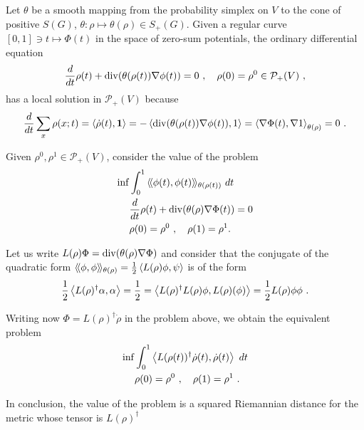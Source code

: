 \documentclass[12pt,a4paper]{amsart}
\begin{document}
Let $\theta$ be a smooth mapping from the probability simplex on $V$ to the
cone of positive $S(G)$, $\theta \colon \rho \mapsto \theta(\rho) \in
S_+(G)$. Given a regular curve $[0,1] \ni t \mapsto \Phi(t)$ in the
space of zero-sum potentials, the ordinary differential equation
\begin{equation*}
  \derivby t \rho(t) +  \Div(\theta(\rho(t))\nabla \phi(t)) = 0 \ , \quad
  \rho(0) = \rho^0 \in \mathcal P_+(V) \ ,
\end{equation*}
has a local solution in $\mathcal P_+(V)$ because
\begin{equation*}
  \derivby t \sum_x \rho(x;t) = \scalarof {\dot \rho(t)}{\one} = 
 - \scalarof {\Div(\theta(\rho(t))\nabla \phi(t))}{1} = \scalarat
 {\theta(\rho)} {\nabla \Phi(t)}{\nabla 1}
 = 0 \ .
\end{equation*}

Given $\rho^0, \rho^1 \in \mathcal P_+(V)$, consider the value of the problem
\begin{align*}
 \inf &\int_0^1 \Scalarat {\theta(\rho(t))} {\phi(t)}{\phi(t)} \ dt
 \\
 &\derivby t \rho(t) +  \Div(\theta(\rho)\nabla \Phi(t)) = 0 \\
 &\rho(0) = \rho^0 \ , \quad \rho(1) = \rho^1.
\end{align*}

Let us write $L(\rho)\Phi = \Div(\theta(\rho)\nabla \Phi)$ and
consider that the conjugate of the quadratic form
$\Scalarat {\theta(\rho)} \phi \phi = \frac 12 \scalarof {L(\rho)\phi}
\psi$ is of the form
\begin{equation*}
  \frac 12 \scalarof {L(\rho)^\dagger \alpha} {\alpha} = \frac12 =
  \scalarof {L(\rho)^\dagger L(\rho) \phi} {L(\rho)(\phi)} = \frac12
  {L(\rho) \phi} \phi \ . 
\end{equation*}

Writing now $\Phi = L(\rho)^\dagger \dot \rho$ in the problem above,
we obtain the equivalent problem
\begin{align*}
 \inf &\int_0^1 \scalarof {L(\rho(t))^\dagger \dot \rho(t)}{\dot \rho(t)} \ dt
 \\
 &\rho(0) = \rho^0 \ , \quad \rho(1) = \rho^1 \ .
\end{align*}

In conclusion, the value of the problem is a squared Riemannian
distance for the metric whose tensor is $L(\rho)^\dagger$



\end{document}
